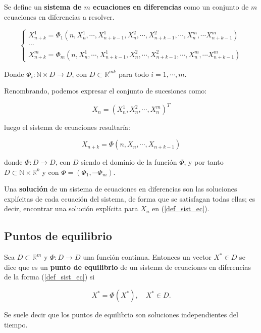 \begin{definition}
Se define un \textbf{sistema de $m$ ecuaciones en diferencias} como un conjunto de $m$ ecuaciones en diferencias a resolver.

\begin{equation}
\begin{cases}
X_{n+k}^1 = \Phi_1(n, X_n^1, \cdots , X_{n+k-1}^1, X_{n}^2, \cdots , X_{n+k-1}^2, \cdots , X_{n}^m, \cdots X_{n+k-1}^m) \\
\cdots \\
X_{n+k}^m = \Phi_m(n, X_n^1, \cdots , X_{n+k-1}^1, X_{n}^2, \cdots , X_{n+k-1}^2, \cdots , X_{n}^m, \cdots X_{n+k-1}^m)
\end{cases}
\end{equation}

Donde $\Phi_i : \mathbb{N}\times D \rightarrow D$, con $D\subset \mathbb{R}^{mk}$ para todo $i=1,\cdots , m$.

Renombrando, podemos expresar el conjunto de sucesiones como:

\begin{equation}
X_n = (X_{n}^1, X_{n}^2, \cdots , X_{n}^m)^{T}
\end{equation}

luego el sistema de ecuaciones resultaría:

\begin{equation}
\label{def_sist_ec}
X_{n+k} = \Phi (n, X_n, \cdots , X_{n+k-1})
\end{equation}


donde $\Phi : D \rightarrow D$, con $D$ siendo el dominio de la función $\Phi$, y por tanto $D\subset \mathbb{N}\times\mathbb{R}^k$ y con $\Phi = (\Phi_1, \cdots \Phi_m)$.

\end{definition}

\begin{definition}
Una \textbf{solución} de un sistema de ecuaciones en diferencias son las soluciones explícitas de cada ecuación del sistema, de forma que se satisfagan todas ellas; es decir, encontrar una solución explícita para $X_n$ en (\ref{def_sist_ec}).
\end{definition}

\subsection{Puntos de equilibrio}

\begin{definition}
Sea $D\subset \mathbb{R}^m$ y $\Phi :D\rightarrow D$ una función continua. Entonces un vector $X^* \in D$ se dice que es un \textbf{punto de equilibrio} de un sistema de ecuaciones en diferencias de la forma (\ref{def_sist_ec}) si

$$X^* = \Phi (X^*),\quad X^* \in D.$$

Se suele decir que los puntos de equilibrio son soluciones independientes del tiempo.
\end{definition}

